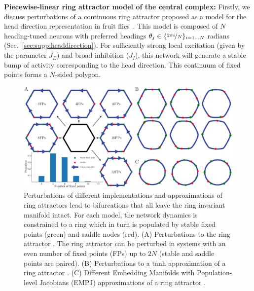 \documentclass{article} %
\newcommand{\ptitle}[1]{\textbf{#1:}\xspace}
\newcounter{ct}
\theoremstyle{definition}
\theoremstyle{remark}
\begin{document}
\ptitle{Piecewise-linear ring attractor model of the central complex}
Firstly, we discuss perturbations of a continuous ring attractor proposed as a model for the head direction representation in fruit flies~\citep{noorman2024accurate}.
This model is composed of \(N\) heading-tuned neurons with preferred headings \(\theta_{j} \in \{\nicefrac{2\pi i}{N}\}_{i = 1\dots N}\) radians (Sec.~\ref{sec:supp:headdirection}).
For sufficiently strong local excitation (given by the parameter \(J_{E}\)) and broad inhibition (\(J_{I}\)), this network will generate a stable bump of activity corresponding to the head direction.
This continuum of fixed points forms a \(N\)-sided polygon. %

\begin{figure}[tbhp]
     \centering
  \includegraphics[width=.8\textwidth]{bio_rings_ss}
       \caption{ Perturbations of different implementations and approximations of ring attractors lead to bifurcations that all leave the ring invariant manifold intact. For each model, the network dynamics is constrained to a ring which in turn is populated by stable fixed points (green) and saddle nodes (red).
       (A) 	Perturbations to the ring attractor \citep{noorman2024accurate}. The ring attractor can be perturbed in systems with an even number of fixed points (FPs) up to \(2N\) (stable and saddle points are paired).
       (B) 	Perturbations to a tanh approximation of a ring attractor \citep{seeholzer2017efficient}.
       (C) 	Different Embedding Manifolds with Population-level Jacobians (EMPJ) approximations of a ring attractor \citep{pollock2020}.
       }\label{fig:bio_rings}
\end{figure}
\end{document}
